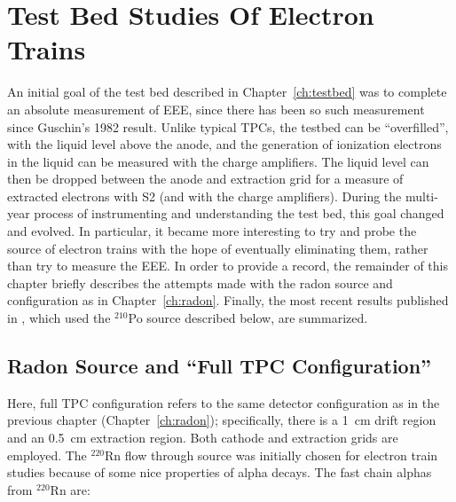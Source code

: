 \section{Test Bed Studies Of Electron Trains}
An initial goal of the test bed described in Chapter~\ref{ch:testbed} was to complete an absolute measurement of \ac{EEE}, since there has been so such measurement since Guschin's 1982 result. Unlike typical \ac{TPC}s, the testbed can be ``overfilled'', with the liquid level above the anode, and the generation of ionization electrons in the liquid can be measured with the charge amplifiers. The liquid level can then be dropped between the anode and extraction grid for a measure of extracted electrons with S2 (and with the charge amplifiers). During the multi-year process of instrumenting and understanding the test bed, this goal changed and evolved. In particular, it became more interesting to try and probe the source of electron trains with the hope of eventually eliminating them, rather than try to measure the \ac{EEE}. In order to provide a record, the remainder of this chapter briefly describes the attempts made with the radon source and configuration as in Chapter~\ref{ch:radon}. Finally, the most recent results published in \cite{SorensenKamdin2018}, which used the $^{210}$Po source described below, are summarized.

\subsection{Radon Source and ``Full TPC Configuration''}
\label{sec:testbed_measurement_challenges}
Here, full \ac{TPC} configuration refers to the same detector configuration as in the previous chapter (Chapter~\ref{ch:radon}); specifically, there is a 1~cm drift region and an 0.5~cm extraction region. Both cathode and extraction grids are employed. The $^{220}$Rn flow through source was initially chosen for electron train studies because of some nice properties of alpha decays. The fast chain alphas from $^{220}$Rn are:

